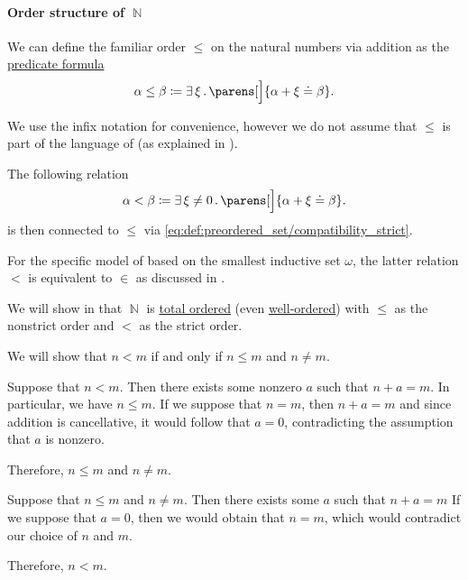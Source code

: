 \paragraph{Order structure of \( \BbbN \)}

\begin{definition}\label{def:natural_numbers_ordering}
  We can define the familiar order \( \leq \) on the natural numbers via addition as the \hyperref[rem:predicate_formula]{predicate formula}
  \begin{equation}\label{eq:def:natural_numbers_ordering/predicate}
    \alpha \leq \beta \coloneqq \qexists \xi \parens[\Big]{ \alpha + \xi \doteq \beta }.
  \end{equation}

  We use the infix notation for convenience, however we do not assume that \( \leq \) is part of the language of  (as explained in ).

  The following relation
  \begin{equation}\label{eq:def:natural_numbers_ordering/strict_predicate}
    \alpha < \beta \coloneqq \qexists {\xi \neq 0} \parens[\Big]{ \alpha + \xi \doteq \beta }.
  \end{equation}
  is then connected to \( \leq \) via \eqref{eq:def:preordered_set/compatibility_strict}.
\end{definition}
\begin{comments}
  \item For the specific model of  based on the smallest inductive set \( \omega \), the latter relation \( < \) is equivalent to \( \in \) as discussed in .
  \item We will show in  that \( \BbbN \) is \hyperref[def:totally_ordered_set]{total ordered} (even \hyperref[def:well_ordered_set]{well-ordered}) with \( \leq \) as the nonstrict order and \( < \) as the strict order.
\end{comments}
\begin{defproof}
  We will show that \( n < m \) if and only if \( n \leq m \) and \( n \neq m \).

  \SufficiencySubProof Suppose that \( n < m \). Then there exists some nonzero \( a \) such that \( n + a = m \). In particular, we have \( n \leq m \). If we suppose that \( n = m \), then \( n + a = m \) and since addition is cancellative, it would follow that \( a = 0 \), contradicting the assumption that \( a \) is nonzero.

  Therefore, \( n \leq m \) and \( n \neq m \).

  \NecessitySubProof Suppose that \( n \leq m \) and \( n \neq m \). Then there exists some \( a \) such that \( n + a = m \) If we suppose that \( a = 0 \), then we would obtain that \( n = m \), which would contradict our choice of \( n \) and \( m \).

  Therefore, \( n < m \).
\end{defproof}

